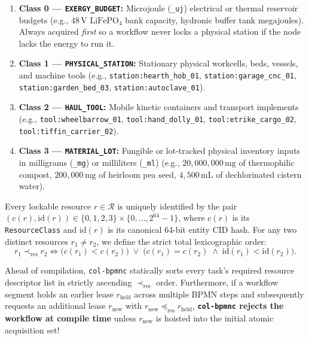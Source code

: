 \begin{enumerate}
\item \textbf{Class 0 --- \texttt{EXERGY\_BUDGET}:} Microjoule (\texttt{\_uj}) electrical or
        thermal reservoir budgets (e.g., $48\,\mathrm{V}$ $\mathrm{LiFePO_4}$ bank capacity,
        hydronic buffer tank megajoules). Always acquired \textit{first} so a workflow never
        locks a physical station if the node lacks the energy to run it.
\item \textbf{Class 1 --- \texttt{PHYSICAL\_STATION}:} Stationary physical workcells, beds,
        vessels, and machine tools (e.g., \texttt{station:hearth\_hob\_01},
        \texttt{station:garage\_cnc\_01}, \texttt{station:garden\_bed\_03},
        \texttt{station:autoclave\_01}).
\item \textbf{Class 2 --- \texttt{HAUL\_TOOL}:} Mobile kinetic containers and transport
        implements (e.g., \texttt{tool:wheelbarrow\_01}, \texttt{tool:hand\_dolly\_01},
        \texttt{tool:etrike\_cargo\_02}, \texttt{tool:tiffin\_carrier\_02}).
\item \textbf{Class 3 --- \texttt{MATERIAL\_LOT}:} Fungible or lot-tracked physical
        inventory inputs in milligrams (\texttt{\_mg}) or milliliters (\texttt{\_ml}) (e.g.,
        $20{,}000{,}000\,\mathrm{mg}$ of thermophilic compost, $200{,}000\,\mathrm{mg}$ of
        heirloom pea seed, $4{,}500\,\mathrm{mL}$ of dechlorinated cistern water).
\end{enumerate}

\begin{definition}
\label{def:ch3-lex-order}
Every lockable resource $r \in \mathcal{R}$ is uniquely identified by the pair $(c(r), \mathrm{id}(r)) \in \{0,1,2,3\} \times \{0, \dots, 2^{64}-1\}$,
where $c(r)$ is its \texttt{ResourceClass} and $\mathrm{id}(r)$ is its canonical 64-bit
entity CID hash. For any two distinct resources $r_1 \neq r_2$, we define the strict total
lexicographic order:
\begin{equation}
r_1 \prec_{\mathrm{res}} r_2 \iff \bigl(c(r_1) < c(r_2)\bigr) \;\lor\; \bigl(c(r_1) = c(r_2) \;\land\; \mathrm{id}(r_1) < \mathrm{id}(r_2)\bigr).
\end{equation}
\end{definition}

Ahead of compilation, \texttt{col-bpmnc} statically sorts every task's required resource
descriptor list in strictly ascending $\prec_{\mathrm{res}}$ order. Furthermore, if a
workflow segment holds an earlier lease $r_{\mathrm{held}}$ across multiple BPMN steps and
subsequently requests an additional lease $r_{\mathrm{new}}$ with $r_{\mathrm{new}} \preceq_{\mathrm{res}} r_{\mathrm{held}}$,
\textbf{\texttt{col-bpmnc} rejects the workflow at compile time} unless $r_{\mathrm{new}}$
is hoisted into the initial atomic acquisition set!

